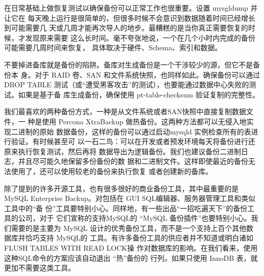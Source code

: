 在日常基础上做恢复测试以确保备份可以正常工作也很重要。设置 mysgldump 并让它在
每天晚上运行是很简单的，但很多时候不会意识到数据随着时间已经增长到可能需要几
天或几周才能再次导人的地步。最糟糕的是当你真正需要恢复的时候，才发现原来需要
这么长时间。毫不夸张地说，一个在几个小时内完成的备份可能需要几周时间来恢复，
具体取决于硬件、Schema、索引和数据。

不要掉进备库就是备份的陷阱。备库对生成备份是一个干涉较少的源，但它不是备份本
身。对于 RAID 卷、SAN 和文件系统快照，也同样如此。确保备份可以通过 DROP TABLE
测试（或“遭受黑客攻击”的测试），也要能通过数据中心失败的测试。如果是基于备
库生成备份，确保使用 pt-table-checksum 验证复制的完整性。

我们最喜欢的两种备份方式，一种是从文件系统或者SAN快照中直接复制数据文件，一
种是使用 Percona XtraBackup 做热备份。这两种方法都可以无侵入地实现二进制的原始
数据备份，这样的备份可以通过启动mysqld 实例检查所有的表进行验证。有时候甚至可
以一石二鸟：可以在开发或者预发环境每天将备份进行还原来执行恢复测试，然后再将
数据导出为逻辑备份。我们也建议备份二进制日志，并且尽可能久地保留多份备份的数
据和二进制文件。这样即使最近的备份无法使用了，还可以使用较老的备份来执行恢复
或者创建新的备库。

除了提到的许多开源工具，也有很多很好的商业备份工具，其中最重要的是 MySQL
Enterprise Backup。对包括在 GUI SQL编辑器、服务器管理工具和类似工具中的“备
份”工具要特别小心。同样地，有一些出品“一招吃遍天下”的备份工具的公司，对于
它们宣称的支持MySQL的 “MySQL 备份插件”也要特别小心。我们需要的是主要为
MySQL 设计的优秀备份工具，而不是一个支持上百个其他数据库并恰巧支持 MySQL的
工具。有许多备份工具的供应者并不知道或明白诸如 FLUSH TABLES WITH READ LOCK操
作对数据库的影响。在我们看来，使用这种SQL命令的方案应该自动退出 “热”备份的
行列。如果只使用 InnoDB 表，就更加不需要这类工具。



